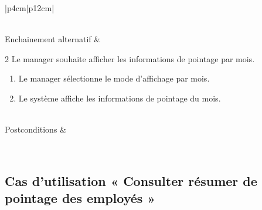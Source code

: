 \begin{longtable}{|p{4cm}|p{12cm}|}
\begin{minipage}[t]{\linewidth}
                            \end{minipage}
                        \\
                        \hline
                        Enchainement alternatif & 
                            \begin{minipage}[t]{\linewidth}
                            2 Le manager souhaite afficher les informations de pointage par mois.
                                \begin{enumerate}[ nosep,after=\strut, ]
                                      \item Le manager sélectionne le mode d’affichage par mois. 
                                      \item Le système affiche les informations de pointage du mois.
                                \end{enumerate}
                            \end{minipage}
                        \\
                        \hline
                        Postconditions &   \\
                        \hline
                                        \caption{Description du cas d'utilisation « Consulter feuille de pointage d'un collaborateur »}\\
            \end{longtable}        
        
    \subsection*{Cas d'utilisation « Consulter résumer de pointage des employés »}
            
